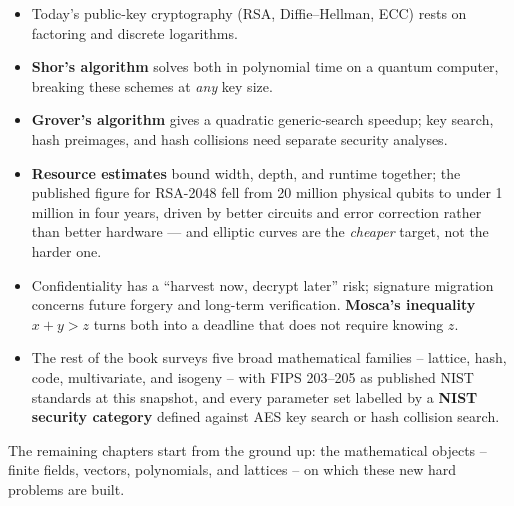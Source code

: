 \begin{itemize}
  \item Today's public-key cryptography (RSA, Diffie--Hellman, ECC) rests on factoring and discrete logarithms.
  \item \textbf{Shor's algorithm} solves both in polynomial time on a quantum computer, breaking these schemes at \emph{any} key size.
  \item \textbf{Grover's algorithm} gives a quadratic generic-search speedup; key search, hash preimages, and hash collisions need separate security analyses.
  \item \textbf{Resource estimates} bound width, depth, and runtime together; the published figure for RSA-2048 fell from 20 million physical qubits to under 1 million in four years, driven by better circuits and error correction rather than better hardware --- and elliptic curves are the \emph{cheaper} target, not the harder one.
  \item Confidentiality has a ``harvest now, decrypt later'' risk; signature migration concerns future forgery and long-term verification. \textbf{Mosca's inequality} $x + y > z$ turns both into a deadline that does not require knowing $z$.
  \item The rest of the book surveys five broad mathematical families -- lattice, hash, code, multivariate, and isogeny -- with FIPS 203--205 as published NIST standards at this snapshot, and every parameter set labelled by a \textbf{NIST security category} defined against AES key search or hash collision search.
\end{itemize}

The remaining chapters start from the ground up: the mathematical objects -- finite fields, vectors, polynomials, and lattices -- on which these new hard problems are built.

\printbibliography[heading=chapterrefs]

